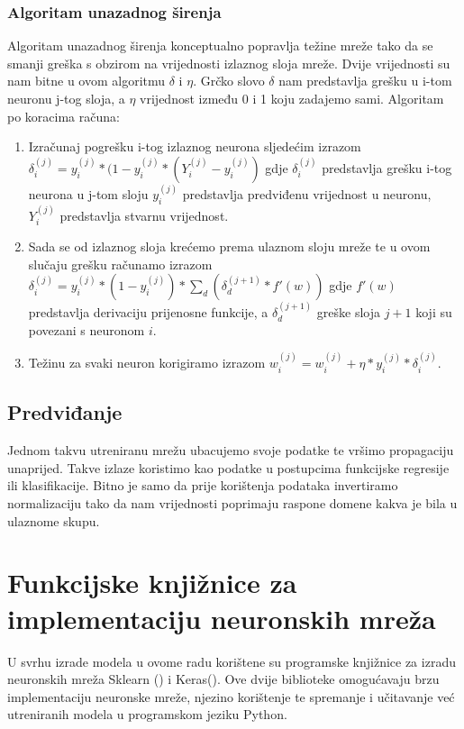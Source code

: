 \documentclass[times, utf8, zavrsni]{fer}
\begin{document}
\subsubsection{Algoritam unazadnog širenja} \label{sec:backprop}
Algoritam unazadnog širenja konceptualno popravlja težine mreže tako da se smanji greška s obzirom na vrijednosti izlaznog sloja mreže. Dvije vrijednosti su nam bitne u ovom algoritmu $\delta$ i $\eta$. Grčko slovo $\delta$ nam predstavlja grešku u i-tom neuronu j-tog sloja, a $\eta$ vrijednost između 0 i 1 koju zadajemo sami. Algoritam po koracima računa: 
\begin{enumerate}
\item Izračunaj pogrešku i-tog izlaznog neurona sljedećim izrazom $\delta_{i}^{(j)} = y_{i}^{(j)} * (1 - y_{i}^{(j)} * (Y_{i}^{(j)} -y_{i}^{(j)})$ gdje $\delta_{i}^{(j)}$ predstavlja grešku i-tog neurona u j-tom sloju $y_{i}^{(j)}$ predstavlja predviđenu vrijednost u neuronu, $Y_{i}^{(j)}$ predstavlja stvarnu vrijednost. 
\item Sada se od izlaznog sloja krećemo prema ulaznom sloju mreže te u ovom slučaju grešku računamo izrazom $\delta_{i}^{(j)} = y_{i}^{(j)} * (1 - y_{i}^{(j)})* \sum_{d}(\delta_{d}^{(j+1)} * f'(w))$ gdje $f'(w)$ predstavlja derivaciju prijenosne funkcije, a  $\delta_{d}^{(j+1)}$ greške sloja $j+1$ koji su povezani s neuronom $i$.
\item Težinu za svaki neuron korigiramo izrazom $w_{i}^{(j)} = w_{i}^{(j)} + \eta * y_{i}^{(j)} * \delta_{i}^{(j)}$.
\end{enumerate}


\subsection{Predviđanje} 
Jednom takvu utreniranu mrežu ubacujemo svoje podatke te vršimo propagaciju unaprijed. Takve izlaze koristimo kao podatke u postupcima funkcijske regresije ili klasifikacije. Bitno je samo da prije korištenja podataka invertiramo normalizaciju tako da nam vrijednosti poprimaju raspone domene kakva je bila u ulaznome skupu.

\section{Funkcijske knjižnice za implementaciju neuronskih mreža}
U svrhu izrade modela u ovome radu korištene su programske knjižnice za izradu neuronskih mreža Sklearn (\cite{scikit-learn}) i Keras(\cite{chollet2015keras}). Ove dvije biblioteke omogućavaju brzu implementaciju neuronske mreže, njezino korištenje te spremanje i učitavanje već utreniranih modela u programskom jeziku Python. 
\end{document}

